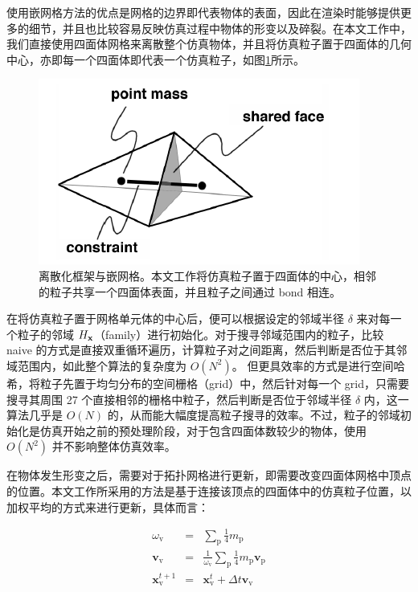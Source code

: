 使用嵌网格方法的优点是网格的边界即代表物体的表面，因此在渲染时能够提供更多的细节，并且也比较容易反映仿真过程中物体的形变以及碎裂。在本文工作中，我们直接使用四面体网格来离散整个仿真物体，并且将仿真粒子置于四面体的几何中心，亦即每一个四面体即代表一个仿真粒子，如图\ref{embedded_mesh}所示。

\begin{figure}[!htb]
  \centering
  \captionsetup{justification=centering}
  \includegraphics[width=0.6\linewidth]{chap/image/embedded_mesh}

  \caption{\label{embedded_mesh}
           离散化框架与嵌网格。本文工作将仿真粒子置于四面体的中心，相邻的粒子共享一个四面体表面，并且粒子之间通过 bond 相连。
          }
\end{figure}

在将仿真粒子置于网格单元体的中心后，便可以根据设定的邻域半径 $\delta$ 来对每一个粒子的邻域 $H_{\mathbf{x}}$（family）进行初始化。对于搜寻邻域范围内的粒子，比较 naive 的方式是直接双重循环遍历，计算粒子对之间距离，然后判断是否位于其邻域范围内，如此整个算法的复杂度为 $O(N^2)$。 但更具效率的方式是进行空间哈希，将粒子先置于均匀分布的空间栅格（grid）中，然后针对每一个 grid，只需要搜寻其周围 27 个直接相邻的栅格中粒子，然后判断是否位于邻域半径 $\delta$ 内，这一算法几乎是 $O(N)$ 的，从而能大幅度提高粒子搜寻的效率。不过，粒子的邻域初始化是仿真开始之前的预处理阶段，对于包含四面体数较少的物体，使用 $O(N^2)$ 并不影响整体仿真效率。

在物体发生形变之后，需要对于拓扑网格进行更新，即需要改变四面体网格中顶点的位置。本文工作所采用的方法是基于连接该顶点的四面体中的仿真粒子位置，以加权平均的方式来进行更新，具体而言：

\begin{eqnarray}
\omega_{\mathrm{v}} &=& \sum_{\mathrm{p}} \frac{1}{4}m_{\mathrm{p}}\\
\textbf{v}_{\mathrm{v}} &=& \frac{1}{\omega_{\mathrm{v}}}\sum_{\mathrm{p}}\frac{1}{4}m_{\mathrm{p}}\textbf{v}_{\mathrm{p}}\\
\mathbf{x}_{\mathrm{v}}^{t+1} &=& \mathbf{x}_{\mathrm{v}}^{t} + \Delta t\textbf{v}_{\mathrm{v}}
\end{eqnarray}

